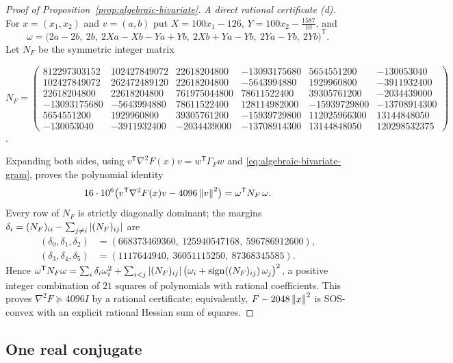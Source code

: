 \begin{proof}[Proof of Proposition~\ref{prop:algebraic-bivariate}]
\emph{A direct rational certificate (d).} For $x=(x_1,x_2)$ and
$v=(a,b)$ put $X=100x_1-126$, $Y=100x_2-\tfrac{1587}{10}$, and
\[
 \omega=\bigl(2a-2b,\ 2b,\ 2Xa-Xb-Ya+Yb,\ 2Xb+Ya-Yb,\ 2Ya-Yb,\ 2Yb\bigr)^{\mathsf T}.
\]
Let $N_F$ be the symmetric integer matrix
\begin{center}
\footnotesize
\setlength{\arraycolsep}{2.5pt}
$N_F=\begin{pmatrix}
 812297303152&102427849072&22618204800&-13093175680&5654551200&-130053040\\
 102427849072&262472489120&22618204800&-5643994880&1929960800&-3911932400\\
 22618204800&22618204800&761975044800&78611522400&39305761200&-2034439000\\
 -13093175680&-5643994880&78611522400&128114982000&-15939729800&-13708914300\\
 5654551200&1929960800&39305761200&-15939729800&112025966300&13144848050\\
 -130053040&-3911932400&-2034439000&-13708914300&13144848050&120298532375
 \end{pmatrix}$.
\end{center}
Expanding both sides, using $v^{\mathsf T}\nabla^2F(x)v=w^{\mathsf
T}\Gamma_Fw$ and \eqref{eq:algebraic-bivariate-gram}, proves the polynomial
identity
\begin{equation}
 16\cdot10^6\bigl(v^{\mathsf T}\nabla^2F(x)v-4096\left\lVert v\right\rVert^2\bigr)
 =\omega^{\mathsf T}N_F\,\omega .
 \label{eq:algebraic-bivariate-squares}
\end{equation}
Every row of $N_F$ is strictly diagonally dominant; the margins
$\delta_i=(N_F)_{ii}-\sum_{j\ne i}\left\lvert(N_F)_{ij}\right\rvert$ are
\[
\begin{aligned}
 (\delta_0,\delta_1,\delta_2)&=(668373469360,\ 125940547168,\ 596786912600),\\
 (\delta_3,\delta_4,\delta_5)&=(1117644940,\ 36051115250,\ 87368345585).
\end{aligned}
\]
Hence
$\omega^{\mathsf T}N_F\omega=\sum_i\delta_i\omega_i^2+\sum_{i<j}\left\lvert(N_F)_{ij}\right\rvert
\bigl(\omega_i+\operatorname{sign}((N_F)_{ij})\,\omega_j\bigr)^2$, a positive
integer combination of $21$ squares of polynomials with rational coefficients.
This proves $\nabla^2F\succeq4096I$ by a rational certificate; equivalently,
$F-2048\left\lVert x\right\rVert^2$ is SOS-convex with an explicit rational Hessian sum of
squares.
\end{proof}

\subsection{One real conjugate}
\label{app:algebraic-conjugate}

